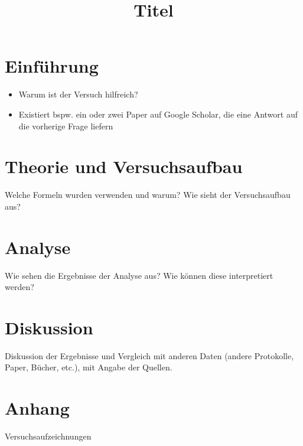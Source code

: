 \documentclass[bibliography=totocnumbered]{scrartcl}
\title{Titel}
\begin{document}
    
    \tableofcontents
    \listoffigures
    \listoftables
    
    \newpage
    \section{Einführung}
        \begin{itemize}
            \item Warum ist der Versuch hilfreich?
            \item Existiert \ac{bspw.} ein oder zwei Paper auf Google Scholar, die eine Antwort auf die vorherige Frage liefern
        \end{itemize}
    \section{Theorie und Versuchsaufbau}
        Welche Formeln wurden verwenden und warum? Wie sieht der Versuchsaufbau aus?
    \section{Analyse}
        Wie sehen die Ergebnisse der Analyse aus? Wie können diese interpretiert werden?
    \section{Diskussion}
        Diskussion der Ergebnisse und Vergleich mit anderen Daten (andere Protokolle, Paper, Bücher, \ac{etc.}), mit Angabe der Quellen.

    \newpage
    \appendix
    \section{Anhang}
    Versuchsaufzeichnungen
    \newpage
    \printbibliography[title={Literatur}]
\end{document}
